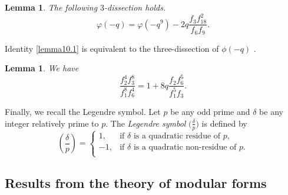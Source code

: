 \documentclass[12pt]{amsart}
\theoremstyle{plain}
\newtheorem{lemma}[theorem]{Lemma}
\theoremstyle{definition}
\begin{document}
\begin{lemma} \label{lemma10} The following $3$-dissection holds.
\begin{equation}
\varphi(-q)=\varphi(-q^9) -2q\dfrac{f_{3}f_{18}^{2}}{f_{6}f_{9}}. \label{lemma10.1}
\end{equation}
\end{lemma}
\noindent Identity \eqref{lemma10.1} is equivalent to the three-dissection of $\phi(-q)$ \cite{AndrewsHirschhornSellers2010}.

\begin{lemma}\cite[Eq. 5.1]{Son1998} We have \label{lemma9} 
\begin{equation} 
\frac{f_{2}^{4} f_{3}^{8}}{f_{1}^{8} f_{6}^{4}} = 1+8q \frac{f_{2} f_{6}^{5}}{f_{1}^{5} f_{3}}. \label{lemma9.1}
\end{equation}
\end{lemma}


Finally, we recall the Legendre symbol. Let $p$ be any odd prime and $\delta$ be any integer relatively prime to $p$. The \emph{Legendre symbol} $\bigl( \frac{\delta}{p} \bigl)$ is defined by
\begin{equation*}
        \left( \frac{\delta}{p} \right) = \begin{cases}
                      1,  &\text{if $\delta$ is a quadratic residue of $p$,}\\
                     -1,  &\text{if $\delta$ is a quadratic non-residue of $p$.}\\
                    \end{cases}
\end{equation*}



\subsection{Results from the theory of modular forms}
\end{document}
